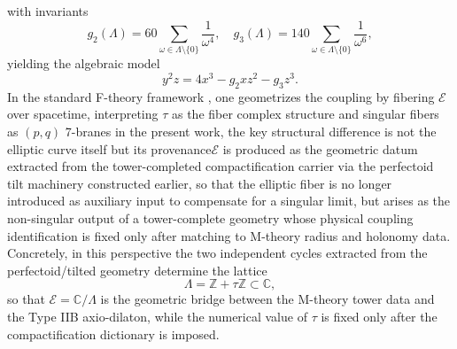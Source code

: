 \documentclass[11pt]{article}
\theoremstyle{remark}
\newcommand{\C}{\mathbb{C}}
\newcommand{\calE}{\mathcal{E}}
\begin{document}
with invariants
\begin{equation}
g_2(\Lambda) = 60 \sum_{\omega \in \Lambda \setminus \{0\}} \frac{1}{\omega^{4}}, \quad
g_3(\Lambda) = 140 \sum_{\omega \in \Lambda \setminus \{0\}} \frac{1}{\omega^{6}},
\end{equation}
yielding the algebraic model
\begin{equation}
y^2 z = 4 x^3 - g_2 x z^{2} - g_3 z^{3}.
\end{equation}
In the standard F-theory framework \cite{Vafa1996}, one geometrizes the coupling by fibering \(\calE\) over spacetime, interpreting \(\tau\) as the fiber complex structure and singular fibers as \((p,q)\) 7-branes\; in the present work, the key structural difference is not the elliptic curve itself but its provenance\:\(\calE\) is produced as the geometric datum extracted from the tower-completed compactification carrier via the perfectoid tilt machinery constructed earlier, so that the elliptic fiber is no longer introduced as auxiliary input to compensate for a singular limit, but arises as the non-singular output of a tower-complete geometry whose physical coupling identification is fixed only after matching to M-theory radius and holonomy data. Concretely, in this perspective the two independent cycles extracted from the perfectoid/tilted geometry determine the lattice
\begin{equation}
\Lambda = \mathbb{Z} + \tau \mathbb{Z} \subset \mathbb{C},
\end{equation}
so that \(\calE=\C/\Lambda\) is the geometric bridge between the M-theory tower data and the Type IIB axio-dilaton, while the numerical value of \(\tau\) is fixed only after the compactification dictionary is imposed.
\end{document}
